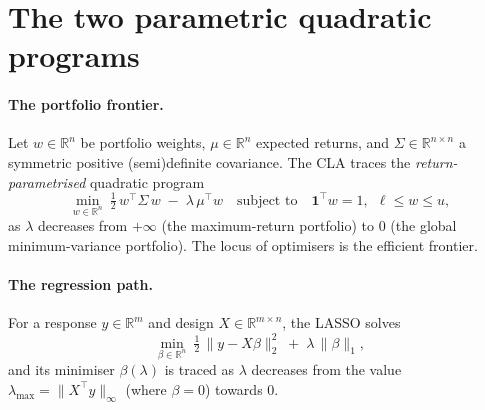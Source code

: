 \documentclass[11pt]{article}
\newcommand{\R}{\mathbb{R}}
\newcommand{\Sig}{\Sigma}
\newcommand{\trans}{^{\top}}
\newcommand{\lb}{\ell}
\newcommand{\ub}{u}
\begin{document}
\section{The two parametric quadratic programs}

\paragraph{The portfolio frontier.}
Let $w\in\R^n$ be portfolio weights, $\mu\in\R^n$ expected returns, and
$\Sig\in\R^{n\times n}$ a symmetric positive (semi)definite covariance. The CLA
traces the \emph{return-parametrised} quadratic program
\begin{equation}
\label{eq:cla}
\min_{w\in\R^n}\ \tfrac12\, w\trans \Sig\, w \;-\; \lambda\, \mu\trans w
\quad\text{subject to}\quad \mathbf{1}\trans w = 1,\ \ \lb \le w \le \ub,
\end{equation}
as $\lambda$ decreases from $+\infty$ (the maximum-return portfolio) to $0$ (the
global minimum-variance portfolio). The locus of optimisers is the efficient
frontier.

\paragraph{The regression path.}
For a response $y\in\R^m$ and design $X\in\R^{m\times n}$, the LASSO solves
\begin{equation}
\label{eq:lasso}
\min_{\beta\in\R^n}\ \tfrac12\,\|y - X\beta\|_2^2 \;+\; \lambda\,\|\beta\|_1 ,
\end{equation}
and its minimiser $\beta(\lambda)$ is traced as $\lambda$ decreases from the value
$\lambda_{\max}=\|X\trans y\|_\infty$ (where $\beta=0$) towards $0$.
\end{document}
